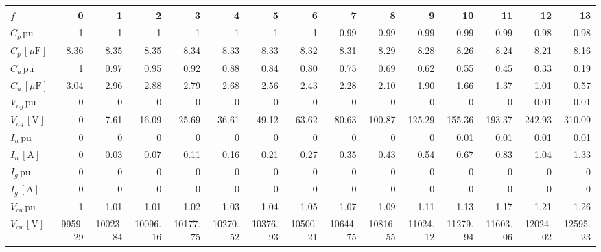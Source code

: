 \begin{tabular}{lrrrrrrrrrrrrrr}
\toprule
$f$ & 0 & 1 & 2 & 3 & 4 & 5 & 6 & 7 & 8 & 9 & 10 & 11 & 12 & 13 \\
\midrule
$C_p \, \mathrm{pu}$ & 1 & 1 & 1 & 1 & 1 & 1 & 1 & 0.99 & 0.99 & 0.99 & 0.99 & 0.99 & 0.98 & 0.98 \\
$C_p \, [\mu\mathrm{F}]$ & 8.36 & 8.35 & 8.35 & 8.34 & 8.33 & 8.33 & 8.32 & 8.31 & 8.29 & 8.28 & 8.26 & 8.24 & 8.21 & 8.16 \\
$C_u \, \mathrm{pu}$ & 1 & 0.97 & 0.95 & 0.92 & 0.88 & 0.84 & 0.80 & 0.75 & 0.69 & 0.62 & 0.55 & 0.45 & 0.33 & 0.19 \\
$C_u \, [\mu\mathrm{F}]$ & 3.04 & 2.96 & 2.88 & 2.79 & 2.68 & 2.56 & 2.43 & 2.28 & 2.10 & 1.90 & 1.66 & 1.37 & 1.01 & 0.57 \\
$V_{ng} \, \mathrm{pu}$ & 0 & 0 & 0 & 0 & 0 & 0 & 0 & 0 & 0 & 0 & 0 & 0 & 0.01 & 0.01 \\
$V_{ng} \, [\mathrm{V}]$ & 0 & 7.61 & 16.09 & 25.69 & 36.61 & 49.12 & 63.62 & 80.63 & 100.87 & 125.29 & 155.36 & 193.37 & 242.93 & 310.09 \\
$I_{n} \, \mathrm{pu}$ & 0 & 0 & 0 & 0 & 0 & 0 & 0 & 0 & 0 & 0 & 0.01 & 0.01 & 0.01 & 0.01 \\
$I_{n} \, [\mathrm{A}]$ & 0 & 0.03 & 0.07 & 0.11 & 0.16 & 0.21 & 0.27 & 0.35 & 0.43 & 0.54 & 0.67 & 0.83 & 1.04 & 1.33 \\
$I_{g} \, \mathrm{pu}$ & 0 & 0 & 0 & 0 & 0 & 0 & 0 & 0 & 0 & 0 & 0 & 0 & 0 & 0 \\
$I_{g} \, [\mathrm{A}]$ & 0 & 0 & 0 & 0 & 0 & 0 & 0 & 0 & 0 & 0 & 0 & 0 & 0 & 0 \\
$V_{cu} \, \mathrm{pu}$ & 1 & 1.01 & 1.01 & 1.02 & 1.03 & 1.04 & 1.05 & 1.07 & 1.09 & 1.11 & 1.13 & 1.17 & 1.21 & 1.26 \\
$V_{cu} \, [\mathrm{V}]$ & 9959.29 & 10023.84 & 10096.16 & 10177.75 & 10270.52 & 10376.93 & 10500.21 & 10644.75 & 10816.55 & 11024.12 & 11279.94 & 11603.06 & 12024.02 & 12595.23 \\
\bottomrule
\end{tabular}